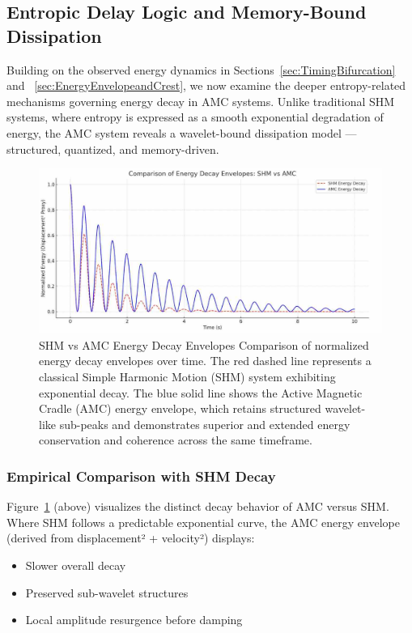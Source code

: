 \documentclass[10pt,aps,pre,onecolumn,superscriptaddress,notitlepage]{revtex4-2}
\begin{document}
\subsection{Entropic Delay Logic and Memory-Bound Dissipation}
\label{sec:EntropicDelayLogic}
Building on the observed energy dynamics in Sections~\ref{sec:TimingBifurcation} and ~\ref{sec:EnergyEnvelopeandCrest}, we now examine the deeper entropy-related mechanisms governing energy decay in AMC systems. Unlike traditional SHM systems, where entropy is expressed as a smooth exponential degradation of energy, the AMC system reveals a wavelet-bound dissipation model — structured, quantized, and memory-driven.

\begin{figure}[htbp]
  \centering
  \includegraphics[width=0.65\linewidth]{figures/Comparison_of_normalised_energy_decay.jpg}
  \caption{SHM vs AMC Energy Decay Envelopes
Comparison of normalized energy decay envelopes over time. The red dashed line represents a classical Simple Harmonic Motion (SHM) system exhibiting exponential decay. The blue solid line shows the Active Magnetic Cradle (AMC) energy envelope, which retains structured wavelet-like sub-peaks and demonstrates superior and extended energy conservation and coherence across the same timeframe. 
}
  \label{fig:shmamc}
\end{figure}
\subsubsection{Empirical Comparison with SHM Decay
}
Figure~\ref{fig:shmamc} (above) visualizes the distinct decay behavior of AMC versus SHM. Where SHM follows a predictable exponential curve, the AMC energy envelope (derived from displacement² + velocity²) displays:
\begin{itemize}
    \item Slower overall decay
    \item Preserved sub-wavelet structures
    \item Local amplitude resurgence before damping
\end{itemize}
\end{document}
